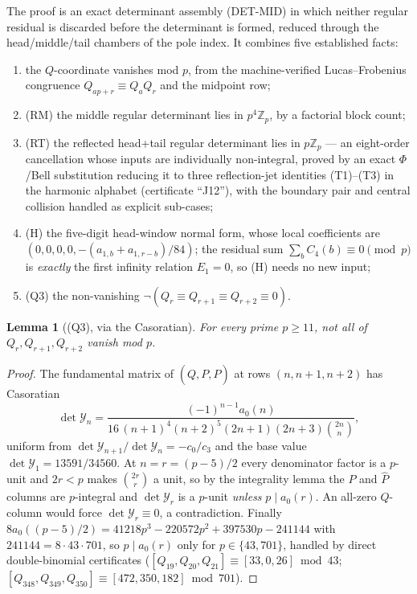 \documentclass[11pt]{article}
\newtheorem{lemma}[theorem]{Lemma}
\theoremstyle{definition}
\newcommand{\Z}{\mathbb{Z}}
\newcommand{\Zp}{\Z_p}
\newcommand{\bin}[2]{\binom{#1}{#2}}
\newcommand{\Ph}{\widehat{P}}
\begin{document}
The proof is an exact determinant assembly (DET-MID) in which neither regular
residual is discarded before the determinant is formed, reduced through the
head/middle/tail chambers of the pole index. It combines five established
facts:
\begin{enumerate}[label=\textup{(\roman*)},nosep]
\item the $Q$-coordinate vanishes mod $p$, from the machine-verified
Lucas--Frobenius congruence $Q_{ap+r}\equiv Q_aQ_r$ and the midpoint row;
\item (RM) the middle regular determinant lies in $p^4\Zp$, by a factorial
block count;
\item (RT) the reflected head+tail regular determinant lies in $p\Zp$ --- an
eight-order cancellation whose inputs are individually non-integral, proved
by an exact $\Phi$/Bell substitution reducing it to three reflection-jet
identities (T1)--(T3) in the harmonic alphabet (certificate ``J12''), with
the boundary pair and central collision handled as explicit sub-cases;
\item (H) the five-digit head-window normal form, whose local coefficients
are $(0,0,0,0,-(a_{1,b}+a_{1,r-b})/84)$; the residual sum
$\sum_b C_4(b) \equiv 0 \pmod p$ is \emph{exactly} the first infinity
relation $E_1 = 0$, so (H) needs no new input;
\item (Q3) the non-vanishing $\lnot(Q_r \equiv Q_{r+1} \equiv Q_{r+2} \equiv 0)$.
\end{enumerate}

\begin{lemma}[(Q3), via the Casoratian]\label{lem:q3}
For every prime $p \ge 11$, not all of $Q_r, Q_{r+1}, Q_{r+2}$ vanish mod $p$.
\end{lemma}

\begin{proof}
The fundamental matrix of $(Q,P,\Ph)$ at rows $(n,n+1,n+2)$ has Casoratian
\begin{equation}\label{eq:cas}
\det \mathcal Y_n = \frac{(-1)^{n-1}a_0(n)}
{16\,(n+1)^4(n+2)^5(2n+1)(2n+3)\bin{2n}n},
\end{equation}
uniform from $\det\mathcal Y_{n+1}/\det\mathcal Y_n = -c_0/c_3$ and the base
value $\det\mathcal Y_1 = 13591/34560$. At $n = r = (p-5)/2$ every denominator
factor is a $p$-unit and $2r < p$ makes $\bin{2r}r$ a unit, so by the
integrality lemma the $P$ and $\Ph$ columns are $p$-integral and
$\det\mathcal Y_r$ is a $p$-unit \emph{unless} $p \mid a_0(r)$. An all-zero
$Q$-column would force $\det\mathcal Y_r \equiv 0$, a contradiction. Finally
$8a_0((p-5)/2) = 41218p^3 - 220572p^2 + 397530p - 241144$ with
$241144 = 8\cdot 43\cdot 701$, so $p \mid a_0(r)$ only for $p \in \{43,701\}$,
handled by direct double-binomial certificates
($[Q_{19},Q_{20},Q_{21}] \equiv [33,0,26]\bmod 43$;
$[Q_{348},Q_{349},Q_{350}] \equiv [472,350,182]\bmod 701$).
\end{proof}
\end{document}
